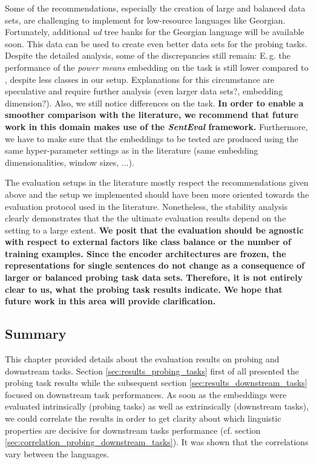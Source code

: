 Some of the recommendations, especially the creation of large and balanced data sets, are challenging to implement for low-resource languages like Georgian. Fortunately, additional \textit{\gls{ud}} tree banks for the Georgian language will be available soon. This data can be used to create even better data sets for the probing tasks. Despite the detailed analysis, some of the discrepancies still remain: E.\,g. the performance of the \textit{power means} embedding on the  task is still lower compared to \citep{Perone.2018}, despite less classes in our setup. Explanations for this circumstance are speculative and require further analysis (even larger data sets?, embedding dimension?). Also, we still notice differences on the  task. \textbf{In order to enable a smoother comparison with the literature, we recommend that future work in this domain makes use of the \textit{SentEval} framework.} Furthermore, we have to make sure that the embeddings to be tested are produced using the same hyper-parameter settings as in the literature (same embedding dimensionalities, window sizes, ...).

The evaluation setups in the literature mostly respect the recommendations given above and the setup we implemented should have been more oriented towards the evaluation protocol used in the literature. Nonetheless, the stability analysis clearly demonstrates that the the ultimate evaluation results depend on the setting to a large extent. \textbf{We posit that the evaluation should be agnostic with respect to external factors like class balance or the number of training examples. Since the encoder architectures are frozen, the representations for single sentences do not change as a consequence of larger or balanced probing task data sets. Therefore, it is not entirely clear to us, what the probing task results indicate. We hope that future work in this area will provide clarification.}

\subsection{Summary}
\label{sec:results_eval_summary}

This chapter provided details about the evaluation results on probing and downstream tasks. Section \vref{sec:results_probing_tasks} first of all presented the probing task results while the subsequent section \vref{sec:results_downstream_tasks} focused on downstream task performances. As soon as the embeddings were evaluated intrinsically (probing tasks) as well as extrinsically (downstream tasks), we could correlate the results in order to get clarity about which linguistic properties are decisive for downstream tasks performance (cf. section \vref{sec:correlation_probing_downstream_tasks}). It was shown that the correlations vary between the languages.


